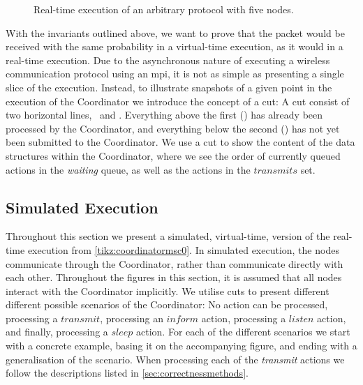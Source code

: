 \begin{figure}[H]
    \centering
    \caption{Real-time execution of an arbitrary protocol with five nodes.}\label{tikz:coordinatormsc0}
\end{figure}

With the invariants outlined above, we want to prove that the packet would be received with the same
probability in a virtual-time execution, as it would in a real-time execution. Due to the asynchronous nature
of executing a wireless communication protocol using an \gls{mpi}, it is not as simple as presenting a single
slice of the execution. Instead, to illustrate snapshots of a given point in the execution of the Coordinator
we introduce the concept of a cut: A cut consist of two horizontal lines, \ProcessedLine\ and \SubmittedLine.
Everything above the first (\ProcessedLine) has already been processed by the Coordinator, and everything
below the second (\SubmittedLine) has not yet been submitted to the Coordinator. We use a cut to show the
content of the data structures within the Coordinator, where we see the order of currently queued actions in
the \textit{waiting} queue, as well as the actions in the $\mathit{transmits}$ set.

\subsection{Simulated Execution}
Throughout this section we present a simulated, virtual-time, version of the real-time execution from
\autoref{tikz:coordinatormsc0}. In simulated execution, the nodes communicate through the Coordinator, rather
than communicate directly with each other. Throughout the figures in this section, it is assumed that all
nodes interact with the Coordinator implicitly. We utilise cuts to present different different possible
scenarios of the Coordinator: No action can be processed, processing a $\mathit{transmit}$, processing an
$\mathit{inform}$ action, processing a $\mathit{listen}$ action, and finally, processing a $\mathit{sleep}$
action. For each of the different scenarios we start with a concrete example, basing it on the accompanying
figure, and ending with a generalisation of the scenario. When processing each of the \textit{transmit}
actions we follow the descriptions listed in \autoref{sec:correctnessmethods}.

